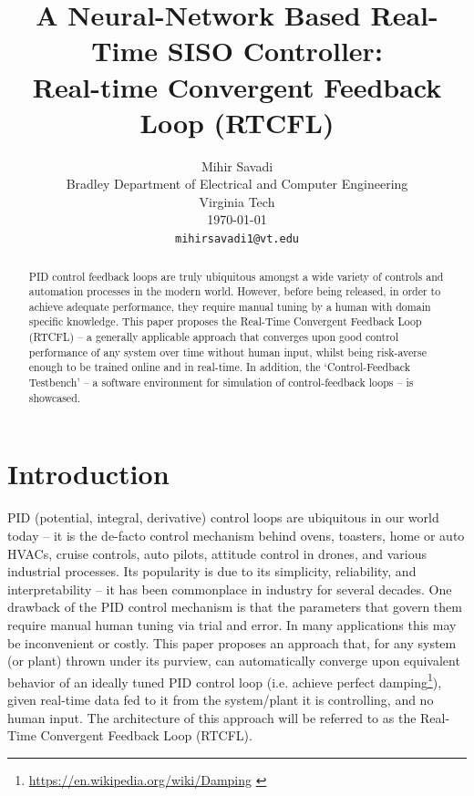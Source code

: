 \documentclass[10pt,twocolumn,letterpaper]{article}
\begin{document}
    \title{A Neural-Network Based Real-Time SISO Controller:\\Real-time Convergent Feedback Loop (RTCFL)}

    \author{Mihir Savadi\\
    Bradley Department of Electrical and Computer Engineering\\
    Virginia Tech\\ \today\\
    {\tt\small mihirsavadi1@vt.edu} }

    \maketitle
    \thispagestyle{empty}

    \begin{abstract} 
        PID control feedback loops are truly ubiquitous amongst a wide variety of controls and automation processes in
        the modern world. However, before being released, in order to achieve adequate performance, they require manual
        tuning by a human with domain specific knowledge. This paper proposes the Real-Time Convergent Feedback Loop
        (RTCFL) -- a generally applicable approach that converges upon good control performance of any system over time
        without human input, whilst being risk-averse enough to be trained online and in real-time. In addition, the
        `Control-Feedback Testbench' -- a software environment for simulation of control-feedback loops -- is showcased.
    \end{abstract}
    \tableofcontents

    \section{Introduction} \label{intro}

        PID (potential, integral, derivative) control loops are ubiquitous in our world today -- it is the de-facto
        control mechanism behind ovens, toasters, home or auto HVACs, cruise controls, auto pilots, attitude control in
        drones, and various industrial processes. Its popularity is due to its simplicity, reliability, and
        interpretability -- it has been commonplace in industry for several decades. One drawback of the PID control
        mechanism is that the parameters that govern them require manual human tuning via trial and error. In many
        applications this may be inconvenient or costly. This paper proposes an approach that, for any system (or plant)
        thrown under its purview, can automatically converge upon equivalent behavior of an ideally tuned PID control
        loop (i.e. achieve perfect damping\footnote{\url{https://en.wikipedia.org/wiki/Damping} \label{wikidamp}}),
        given real-time data fed to it from the system/plant it is controlling, and no human input. The architecture of
        this approach will be referred to as the Real-Time Convergent Feedback Loop (RTCFL).
\end{document}
